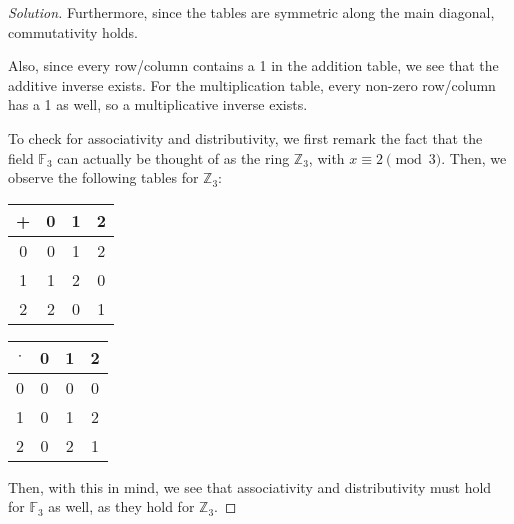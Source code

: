 \documentclass{article}
\newenvironment{solution}{\begin{proof}[Solution]}{\end{proof}}
\newcommand{\ZZ}{\mathbb{Z}}
\begin{document}
\begin{solution}
	Furthermore, since the tables are symmetric along the main diagonal, commutativity holds.
	
	Also, since every row/column contains a 1 in the addition table, we see that the additive inverse exists. For the multiplication table, every non-zero row/column has a 1 as well, so a multiplicative inverse exists.
	
	
	To check for associativity and distributivity, we first remark the fact that the field $\mathbb{F}_{3}$ can actually be thought of as the ring $\ZZ_{3}$, with $x \equiv 2 \pmod{3}$. Then, we observe the following tables for $\ZZ_{3}$:
	
	\begin{center}
		\begin{tabular}{c|c c c}
			+ & 0 & 1 & 2 \\
			\hline
			0 & 0 & 1 & 2 \\
			1 & 1 & 2 & 0 \\
			2 & 2 & 0 & 1
		\end{tabular}
	\end{center}
	\begin{center}
	\begin{tabular}{c|c c c}
		$\cdot$ & 0 & 1 & 2 \\
		\hline
		0 & 0 & 0 & 0 \\
		1 & 0 & 1 & 2 \\
		2 & 0 & 2 & 1
	\end{tabular}
\end{center}
	
	Then, with this in mind, we see that associativity and distributivity must hold for $\mathbb{F}_{3}$ as well, as they hold for $\ZZ_{3}$.
\end{solution}

\newpage
\end{document}
